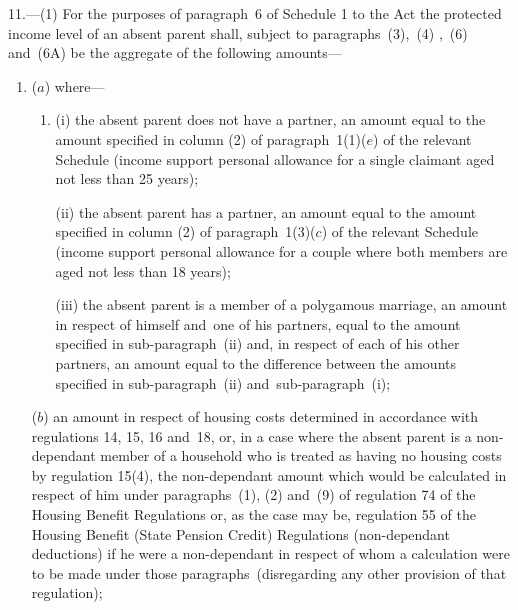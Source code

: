 \documentclass[12pt,a4paper]{article}
\begin{document}
\begin{sloppypar}
11.—(1) For the purposes of paragraph~6 of Schedule 1 to the Act the protected income level of an absent parent shall, 
subject to paragraphs~(3),~(4)%
  ,~(6) and~(6A)  %
be the aggregate of the following amounts—
\end{sloppypar}
\begin{enumerate}\item[]
($a$) where—
\begin{enumerate}\item[]
(i) the absent parent does not have a partner, an amount equal to the amount specified in column (2) of paragraph~1(1)($e$) of the relevant Schedule (income support personal allowance for a single claimant aged not less than 25 years);

(ii) the absent parent has a partner, an amount equal to the amount specified in column (2) of paragraph~1(3)($c$) of the relevant Schedule (income support personal allowance for a couple where both members are aged not less than 18 years);

(iii) the absent parent is a member of a polygamous marriage, an amount in respect of himself and~one of his partners, equal to the amount specified in sub-paragraph~(ii) and, in respect of each of his other partners, an amount equal to the difference between the amounts specified in sub-paragraph~(ii) and~sub-paragraph~(i);
\end{enumerate}

($b$) an amount in respect of housing costs determined in accordance with regulations 14, 15, 16 and~18, or, in a case where the absent parent is a non-dependant member of a household who is treated as having no housing costs by 
regulation 15(4),  %
the non-dependant amount which would be calculated in respect of him under 
paragraphs~(1), (2) and~(9) of 
regulation 74 of the Housing Benefit Regulations or, as the case may be, regulation 55 of the Housing Benefit (State Pension Credit) Regulations  %
(non-dependant deductions) if he were a non-dependant in respect of whom a calculation were to be made under those paragraphs~(disregarding any other provision of that regulation);  %


\end{enumerate}
\end{document}
